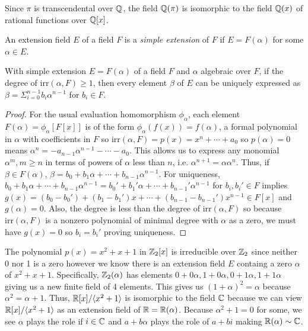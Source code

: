 \begin{remark}
    Since $\pi$ is transcendental over $\mathbb{Q}$, the field $\mathbb{Q}(\pi)$ is isomorphic to the field $\mathbb{Q}(x)$ of rational functions over $\mathbb{Q}[x]$.
\end{remark}
\begin{definition}
    An extension field $E$ of a field $F$ is a \emph{simple extension} of $F$ if $E = F(\alpha)$ for some $\alpha \in E$.
\end{definition}
\begin{theorem}
    With simple extension $E = F(\alpha)$ of a field $F$ and $\alpha$ algebraic over $F$, if the degree of $\text{irr}(\alpha,F) \geq 1$, then every element $\beta$ of $E$ can be uniquely expressed as $\beta = \Sigma_{i=0}^{n-1}b_i\alpha^{n-1}$ for $b_i \in F$.
\end{theorem}
\begin{proof}
    For the usual evaluation homomorphism $\phi_\alpha$, each element $F(\alpha) = \phi_\alpha[F[x]]$ is of the form $\phi_\alpha(f(x)) = f(\alpha)$, a formal polynomial in $\alpha$ with coefficients in $F$ so $\text{irr}(\alpha, F) = p(x) = x^n + \cdots + a_0$ so $p(\alpha) = 0$ means $\alpha^n = -a_{n-1}\alpha^{n-1} - \cdots - a_0$. This allows us to express any monomial $\alpha^m, m \geq n$ in terms of powers of $\alpha$ less than $n$, i.e. $\alpha^{n+1} = \alpha\alpha^n.$ Thus, if $\beta \in F(\alpha)$, $\beta = b_0 + b_1\alpha + \cdots + b_{n-1}\alpha^{n-1}$. For uniqueness, $b_0 + b_1\alpha + \cdots + b_{n-1}\alpha^{n-1} = b_0' + b_1'\alpha + \cdots + b_{n-1}'\alpha^{n-1}$ for $b_i, b_i' \in F$ implies $g(x) = (b_0 - b_0') + (b_1-b_1')x + \cdots + (b_{n-1} - b_{n-1}')x^{n-1} \in F[x]$ and $g(\alpha) = 0$. Also, the degree is less than the degree of $\text{irr}(\alpha,F)$ so because $\text{irr}(\alpha, F)$ is a nonzero polynomial of minimal degree with $\alpha$ as a zero, we must have $g(x) = 0$ so $b_i = b_i'$ proving uniqueness.
\end{proof}
\begin{example}
    The polynomial $p(x) = x^2+x+1$ in $\mathbb{Z}_2[x]$ is irreducible over $\mathbb{Z}_2$ since neither 0 nor 1 is a zero however we know there is an extension field $E$ containg a zero $\alpha$ of $x^2+x+1$. Specifically, $\mathbb{Z}_2(\alpha)$ has elements $0 + 0\alpha, 1 + 0\alpha, 0 + 1\alpha, 1 + 1\alpha$ giving us a new finite field of 4 elements. This gives us $(1+\alpha)^2 = \alpha$ because $\alpha^2 = \alpha + 1$. Thus, $\mathbb{R}[x]/\langle x^2 + 1 \rangle$ is isomorphic to the field $\mathbb{C}$ because we can view $\mathbb{R}[x] / \langle x^2 + 1 \rangle$ as an extension field of $\mathbb{R} = \mathbb{R}(\alpha)$. Because $\alpha^2 + 1 =0$ for some, we see $\alpha$ plays the role if $i \in \mathbb{C}$ and $a + b\alpha$ plays the role of $a + bi$ making $\mathbb{R}(\alpha) \sim \mathbb{C}$.
\end{example}




